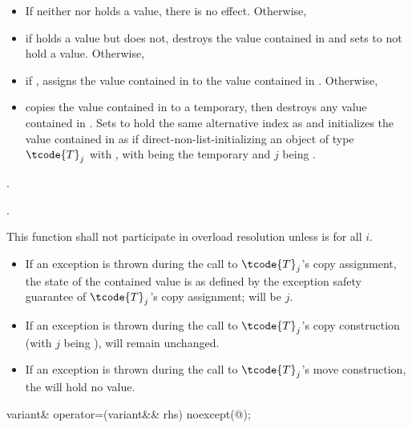 \begin{itemdescr}
\pnum
\effects
\begin{itemize}
\item
If neither  nor  holds a value, there is no effect.  Otherwise,
\item
if  holds a value but  does not, destroys the value
contained in  and sets  to not hold a value.  Otherwise,
\item
if , assigns the value contained in 
to the value contained in . Otherwise,
\item
copies the value contained in  to a temporary, then destroys any
value contained in . Sets  to hold the same
alternative index as  and initializes the value contained in
 as if direct-non-list-initializing an object of type $\tcode{T}_j$
with , with  being the temporary and
$j$ being .
\end{itemize}

\pnum
\returns {}.

\pnum
\postconditions {}.

\pnum
\remarks
This function shall not participate in overload resolution unless
is  for all $i$.
\begin{itemize}
\item If an exception is thrown during the call to $\tcode{T}_j$'s copy assignment,
the state of the contained value is as defined by the exception safety
guarantee of $\tcode{T}_j$'s copy assignment;  will be $j$.
\item If an exception is thrown during the call to $\tcode{T}_j$'s copy construction
(with $j$ being ),  will remain unchanged.
\item If an exception is thrown during the call to $\tcode{T}_j$'s move construction,
the  will hold no value.
\end{itemize}
\end{itemdescr}

%
\begin{itemdecl}
variant& operator=(variant&& rhs) noexcept(@\seebelow@);
\end{itemdecl}

